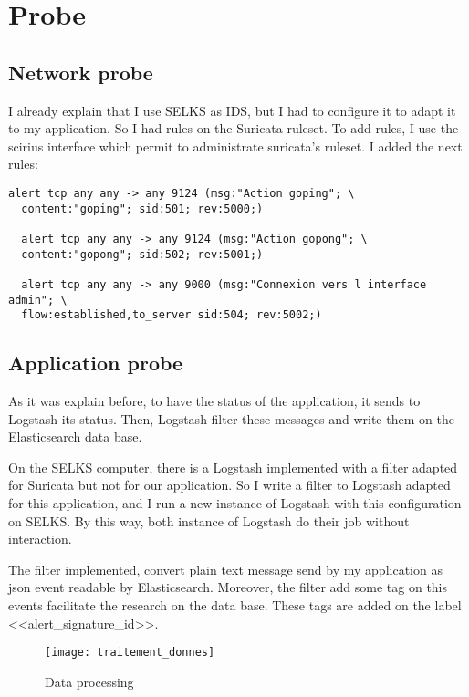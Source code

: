 \section{Probe}

\subsection{Network probe}
\label{sec:rules}

I already explain that I use SELKS as IDS, but I had to configure it to adapt it to my application. So I had rules
on the Suricata ruleset. To add rules, I use the scirius interface which permit to administrate suricata's ruleset.
I added the next rules:

\begin{lstlisting}[language=suricata]
  alert tcp any any -> any 9124 (msg:"Action goping"; \
  content:"goping"; sid:501; rev:5000;)

  alert tcp any any -> any 9124 (msg:"Action gopong"; \
  content:"gopong"; sid:502; rev:5001;)

  alert tcp any any -> any 9000 (msg:"Connexion vers l interface admin"; \
  flow:established,to_server sid:504; rev:5002;)
\end{lstlisting}




\subsection{Application probe}

As it was explain before, to have the status of the application, it sends to Logstash its status. Then, Logstash
filter these messages and write them on the Elasticsearch data base.

On the SELKS computer, there is a Logstash implemented with a filter adapted for Suricata but not for our
application. So I write a filter to Logstash adapted for this application, and I run a new instance of Logstash
with this configuration on SELKS. By this way, both instance of Logstash do their job without interaction.

The filter implemented, convert plain text message send by my application as json event readable by Elasticsearch.
Moreover, the filter add some tag on this events facilitate the research on the data base. These tags are added on the
label <<alert\_signature\_id>>.

\begin{figure}[h]
  \centering
  \texttt{[image: traitement\_donnes]}
  \caption{Data processing}
  \label{fig:dataprocessing}
\end{figure}


